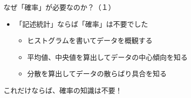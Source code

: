 \documentclass[dvipdfmx,cjk]{beamer}
\begin{document}
\begin{frame}{なぜ「確率」が必要なのか？（１）}\pause


\begin{itemize}

    \item 「記述統計」ならば「確率」は不要でした
    \pause
        \begin{itemize}
        \item ヒストグラムを書いてデータを概観する
        \item 平均値、中央値を算出してデータの中心傾向を知る
        \item 分散を算出してデータの散らばり具合を知る
        \end{itemize}

\end{itemize}

\pause
\vskip 1cm
これだけならば、確率の知識は不要！

\end{frame}
\end{document}

